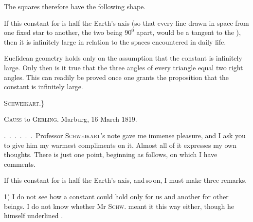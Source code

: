 The squares therefore have the following shape.

\begin{center}\end{center}

If this constant for  is half the Earth's axis (so that every line drawn in space from one fixed star to another, the two being $90^{0}$ apart, would be a tangent to the ), then it is infinitely large in relation to the spaces encountered in daily life.

Euclidean geometry holds only on the assumption that the constant is infinitely large. Only then is it true that the three angles of every triangle equal two right angles. This can readily be proved once one grants the proposition that the constant is infinitely large.

\begin{flushright}\textsc{Schweikart.}\}\end{flushright}

\bigskip
\noindent\hrulefill
\bigskip

\begin{center}
\textsc{Gauss} to \textsc{Gerling}. Marburg, 16 March 1819.
\end{center}

.\ .\ .\ .\ .\ .\ Professor \textsc{Schweikart}'s note gave me immense pleasure, and I ask you to give him my warmest compliments on it. Almost all of it expresses my own thoughts. There is just one point, beginning as follows, on which I have comments.

If this constant for  is half the Earth's axis, and\,so\,on, I must make three remarks.

1) I do not see how a constant could hold only for us and another for other beings. I do not know whether Mr \textsc{Schw.} meant it this way either, though he himself underlined .


